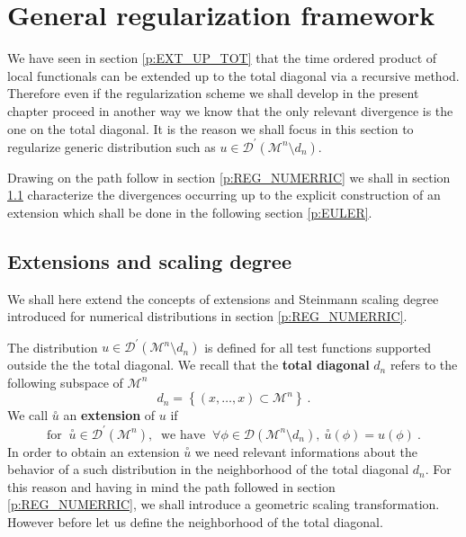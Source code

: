 \documentclass[11pt]{book}
\newcommand{\exte}[1]{\overset{\circ}{#1}}
\newcommand{\Dcal}{\mathcal{D}}
\newcommand{\Mcal}{\mathcal{M}}
\theoremstyle{break}
\begin{document}
\section{General regularization framework}
\label{p:REG_GENERAL}


We have seen in section \ref{p:EXT_UP_TOT} that the time ordered product of local functionals can be extended up to the total diagonal via a recursive method. Therefore even if the regularization scheme we shall develop in the present chapter proceed in another way we know that the only relevant divergence is the one on the total diagonal. It is the reason we shall focus in this section to regularize generic distribution such as $u \in \Dcal^\prime(\Mcal^n \setminus d_n )$.


Drawing on the path follow in section \ref{p:REG_NUMERRIC} we shall in section \ref{p:EXT_SD} characterize the divergences occurring up to the explicit construction of an extension which shall be done in the following section \ref{p:EULER}.


\subsection{Extensions and scaling degree}
\label{p:EXT_SD}


We shall here extend the concepts of extensions and Steinmann scaling degree introduced for numerical distributions in section \ref{p:REG_NUMERRIC}. 


The distribution $u \in \Dcal^\prime(\Mcal^n \setminus d_n )$ is defined for all test functions supported outside the the total diagonal. We recall that the \textbf{total diagonal} $d_n$ refers to the following subspace of $\Mcal^n$
%
\begin{equation}
d_n = \left\{ (x,\dots,x) \subset \Mcal^n \right\} \ .
\label{eq:total_diag_chap_3}
\end{equation}
%
We call $\exte{u}$ an \textbf{extension} of $u$ if 
%
\begin{equation*}
\mbox{for } \ \exte{u} \in \Dcal^\prime(\Mcal^n), \ \mbox{ we have } \ \forall \phi \in \Dcal\left(\Mcal^n \setminus d_n \right), \ \exte{u}(\phi) = u(\phi) \ .
\end{equation*}
%
In order to obtain an extension $\exte{u}$ we need relevant informations about the behavior of a such distribution in the neighborhood of the total diagonal $d_n$. For this reason and having in mind the path followed in section \ref{p:REG_NUMERRIC}, we shall introduce a geometric scaling transformation. However before let us define the neighborhood of the total diagonal.
\end{document}
